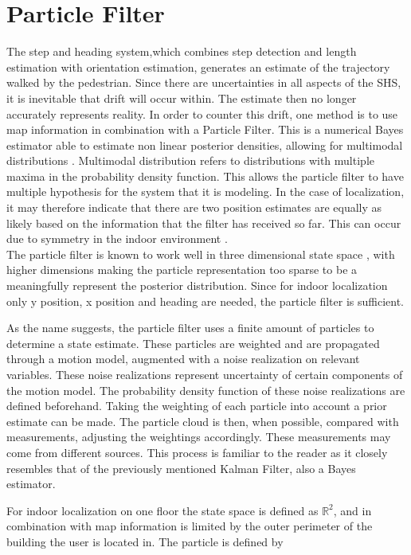\section{Particle Filter}
The step and heading system,which combines step detection and length estimation with orientation estimation, generates an estimate of the trajectory walked by the pedestrian. Since there are uncertainties in all aspects of the SHS, it is inevitable that drift will occur within. The estimate then no longer accurately represents reality. In order to counter this drift, one method is to use map information in combination with a Particle Filter. This is a numerical Bayes estimator able to estimate non linear posterior densities, allowing for multimodal distributions \cite{gustafsson2010particle,kihlberg2012map}. Multimodal distribution refers to distributions with multiple maxima in the probability density function. This allows the particle filter to have multiple hypothesis for the system that it is modeling. In the case of localization, it may therefore indicate that there are two position estimates are equally as likely based on the information that the filter has received so far. This can occur due to symmetry in the indoor environment \cite{Woodman2008}. \\
The particle filter is known to work well in three dimensional state space \cite{gustafsson2010particle}, with higher dimensions making the particle representation too sparse to be a meaningfully represent the posterior distribution. Since for indoor localization only y position, x position and heading are needed, the particle filter is sufficient.
\par
As the name suggests, the particle filter uses a finite amount of particles to determine a state estimate. These particles are weighted and are propagated through a motion model, augmented with a noise realization on relevant variables. These noise realizations represent uncertainty of certain components of the motion model. The probability density function of these noise realizations are defined beforehand. Taking the weighting of each particle into account a prior estimate can be made. The particle cloud is then, when possible, compared with measurements, adjusting the weightings accordingly. These measurements may come from different sources. This process is familiar to the reader as it closely resembles that of the previously mentioned Kalman Filter, also a Bayes estimator.\par
For indoor localization on one floor the state space is defined as $\mathbb{R}^{2}$, and in combination with map information is limited by the outer perimeter of the building the user is located in. The particle is defined by 

